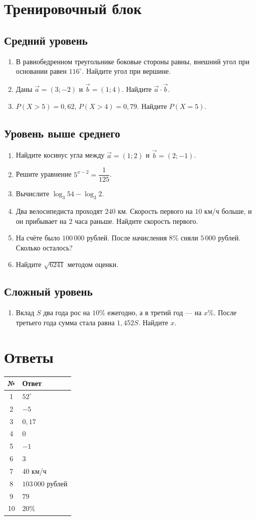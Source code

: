 \documentclass[a4paper,12pt]{article}
\begin{document}
\clearpage
\section*{Тренировочный блок}
\subsection*{Средний уровень}
\begin{enumerate}
\item В равнобедренном треугольнике боковые стороны равны, внешний угол при основании равен $116^\circ$. Найдите угол при вершине.
\item Даны $\vec a=(3;-2)$ и $\vec b=(1;4)$. Найдите $\vec a\cdot\vec b$.
\item $P(X>5)=0{,}62$, $P(X>4)=0{,}79$. Найдите $P(X=5)$.
\end{enumerate}

\subsection*{Уровень выше среднего}
\begin{enumerate}[resume]
\item Найдите косинус угла между $\vec a=(1;2)$ и $\vec b=(2;-1)$.
\item Решите уравнение $5^{x-2}=\dfrac1{125}$.
\item Вычислите $\log_3 54-\log_3 2$.
\item Два велосипедиста проходят $240$ км. Скорость первого на $10$ км/ч больше, и он прибывает на $2$ часа раньше. Найдите скорость первого.
\item На счёте было $100\,000$ рублей. После начисления $8\%$ сняли $5\,000$ рублей. Сколько осталось?
\item Найдите $\sqrt{6241}$ методом оценки.
\end{enumerate}

\subsection*{Сложный уровень}
\begin{enumerate}[resume]
\item Вклад $S$ два года рос на $10\%$ ежегодно, а в третий год --- на $x\%$. После третьего года сумма стала равна $1{,}452S$. Найдите $x$.
\end{enumerate}

\clearpage
\section*{Ответы}
\renewcommand{\arraystretch}{1.45}
\begin{longtable}{@{}cl@{}}
\toprule
№ & Ответ \\
\midrule
1 & $52^\circ$ \\
2 & $-5$ \\
3 & $0{,}17$ \\
4 & $0$ \\
5 & $-1$ \\
6 & $3$ \\
7 & $40$ км/ч \\
8 & $103\,000$ рублей \\
9 & $79$ \\
10 & $20\%$ \\
\bottomrule
\end{longtable}
\end{document}
